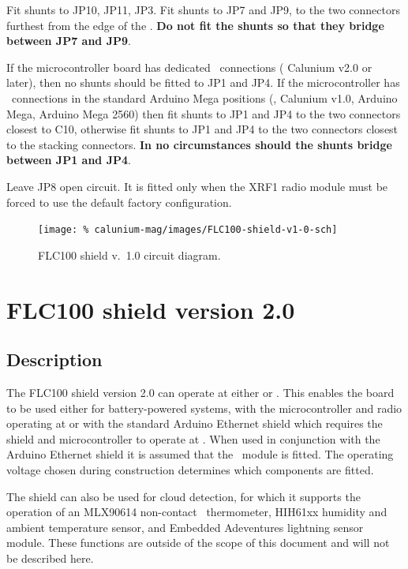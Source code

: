 Fit shunts to JP10, JP11, JP3. Fit shunts to JP7 and JP9, to the two
connectors furthest from the edge of the \pcb. \textbf{Do not fit the
  shunts so that they bridge between JP7 and JP9}.

If the microcontroller board has dedicated \itwoc\ connections (\eg
Calunium v2.0 or later), then no shunts should be fitted to JP1 and
JP4. If the microcontroller has \itwoc\ connections in the standard
Arduino Mega positions (\eg, Calunium v1.0, Arduino Mega, Arduino Mega
2560) then fit shunts to JP1 and JP4 to the two connectors closest to
C10, otherwise fit shunts to JP1 and JP4 to the two connectors closest
to the stacking connectors. \textbf{In no circumstances should the
  shunts bridge between JP1 and JP4}.

Leave JP8 open circuit. It is fitted only when the XRF1 radio module
must be forced to use the default factory configuration.

\begin{landscape}
  \begin{figure}[p]
    \centering
    \texttt{[image: \%
      calunium-mag/images/FLC100-shield-v1-0-sch]}
    \caption{FLC100 shield v.~1.0 circuit diagram.}
    \label{fig:flc100-shield-v1.0-cct-diag}
  \end{figure}
\end{landscape}

\section{FLC100 shield version 2.0}

\subsection{Description}

The FLC100 shield version 2.0 can operate at either  or
. This enables the board to be used either for battery-powered
systems, with the microcontroller and radio operating at  or
with the standard Arduino Ethernet shield which requires the shield
and microcontroller to operate at . When used in conjunction
with the Arduino Ethernet shield it is assumed that the \PoE\ module
is fitted. The operating voltage chosen during construction determines
which components are fitted.

The shield can also be used for cloud detection, for which it supports
the operation of an MLX90614 non-contact \ir\ thermometer, HIH61xx
humidity and ambient temperature sensor, and Embedded Adeventures
lightning sensor module. These functions are outside of the scope of
this document and will not be described here.

